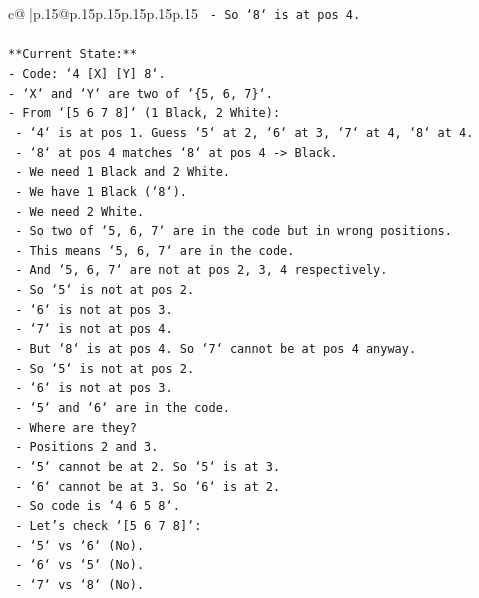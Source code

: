 \documentclass{article}
\begin{document}
{\begin{supertabular}{c@{$\;$}|p{.15\linewidth}@{}p{.15\linewidth}p{.15\linewidth}p{.15\linewidth}p{.15\linewidth}p{.15\linewidth}}
{{{\texttt{        {-} So `8` is at pos 4.} \\
\\ 
\texttt{**Current State:**} \\
\texttt{{-} Code: `4 {[}X{]} {[}Y{]} 8`.} \\
\texttt{{-} `X` and `Y` are two of `\{5, 6, 7\}`.} \\
\texttt{{-} From `{[}5 6 7 8{]}` (1 Black, 2 White):} \\
\texttt{    {-} `4` is at pos 1. Guess `5` at 2, `6` at 3, `7` at 4, `8` at 4.} \\
\texttt{    {-} `8` at pos 4 matches `8` at pos 4 {-}> Black.} \\
\texttt{    {-} We need 1 Black and 2 White.} \\
\texttt{    {-} We have 1 Black (`8`).} \\
\texttt{    {-} We need 2 White.} \\
\texttt{    {-} So two of `5, 6, 7` are in the code but in wrong positions.} \\
\texttt{    {-} This means `5, 6, 7` are in the code.} \\
\texttt{    {-} And `5, 6, 7` are not at pos 2, 3, 4 respectively.} \\
\texttt{    {-} So `5` is not at pos 2.} \\
\texttt{    {-} `6` is not at pos 3.} \\
\texttt{    {-} `7` is not at pos 4.} \\
\texttt{    {-} But `8` is at pos 4. So `7` cannot be at pos 4 anyway.} \\
\texttt{    {-} So `5` is not at pos 2.} \\
\texttt{    {-} `6` is not at pos 3.} \\
\texttt{    {-} `5` and `6` are in the code.} \\
\texttt{    {-} Where are they?} \\
\texttt{    {-} Positions 2 and 3.} \\
\texttt{    {-} `5` cannot be at 2. So `5` is at 3.} \\
\texttt{    {-} `6` cannot be at 3. So `6` is at 2.} \\
\texttt{    {-} So code is `4 6 5 8`.} \\
\texttt{    {-} Let's check `{[}5 6 7 8{]}`:} \\
\texttt{        {-} `5` vs `6` (No).} \\
\texttt{        {-} `6` vs `5` (No).} \\
\texttt{        {-} `7` vs `8` (No).} \\
}}}
\end{supertabular}}
\end{document}
